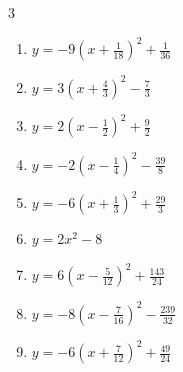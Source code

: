 \begin{multicols}{3}
\begin{enumerate}

  \item $\displaystyle y=-9\left( x+\frac{1}{18}\right)^{2}+\frac{1}{36}$


  \item $\displaystyle y=3\left( x+\frac{4}{3}\right)^{2}-\frac{7}{3}$


  \item $\displaystyle y=2\left( x-\frac{1}{2}\right)^{2}+\frac{9}{2}$


  \item $\displaystyle y=-2\left( x-\frac{1}{4}\right)^{2}-\frac{39}{8}$


  \item $\displaystyle y=-6\left( x+\frac{1}{3}\right)^{2}+\frac{29}{3}$


\columnbreak %

  \item $\displaystyle y=2x^{2}-8$

        \phantom{$\displaystyle 頂点\left( 0 , -8 \right)$}

  \item $\displaystyle y=6\left( x-\frac{5}{12}\right)^{2}+\frac{143}{24}$


  \item $\displaystyle y=-8\left( x-\frac{7}{16}\right)^{2}-\frac{239}{32}$


  \item $\displaystyle y=-6\left( x+\frac{7}{12}\right)^{2}+\frac{49}{24}$



\end{enumerate}
\end{multicols}
